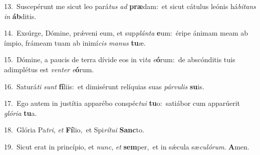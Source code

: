 {\numbfont\textcolor{\numbcolor}{13.}}~Suscepérunt me sicut leo pará\textit{tus} \textit{ad} \textbf{præ}\-dam:~\star et sicut cátulus leónis há\-\textit{bi}\-\textit{tans} \textit{in} \textbf{áb}\-ditis.\par
{\numbfont\textcolor{\numbcolor}{14.}}~Exsúrge, Dómine, prǽveni eum, et sup\-\textit{plán}\-\textit{ta} \textbf{e}\-um:~\star éripe ánimam meam ab ímpio, frámeam tuam ab inimí\textit{cis} \textit{ma}\-\textit{nus} \textbf{tu}\-æ.\par
{\numbfont\textcolor{\numbcolor}{15.}}~Dómine, a paucis de terra dívide eos in vi\textit{ta} \textit{e}\-\textbf{ó}rum:~\star de abscónditis tuis adimplétus est \textit{ven}\-\textit{ter} \textit{e}\-\textbf{ó}rum.\par
{\numbfont\textcolor{\numbcolor}{16.}}~Saturá\textit{ti} \textit{sunt} \textbf{fí}\-liis:~\star et dimisérunt relíquias suas \textit{pár}\-\textit{vu}\textit{lis} \textbf{su}\-is.\par
{\numbfont\textcolor{\numbcolor}{17.}}~Ego autem in justítia apparébo conspéc\-\textit{tu}\-\textit{i} \textbf{tu}\-o:~\star satiábor cum apparúerit \textit{gló}\-\textit{ri}\textit{a} \textbf{tu}\-a.\par
{\numbfont\textcolor{\numbcolor}{18.}}~Glória Pa\-\textit{tri}\-, \textit{et} \textbf{Fí}\-lio,~\star et Spi\-\textit{rí}\-\textit{tu}\textit{i} \textbf{Sanc}\-to.\par
{\numbfont\textcolor{\numbcolor}{19.}}~Sicut erat in princípio, et \textit{nunc}\-, \textit{et} \textbf{sem}\-per,~\star et in sǽcula sæ\-\textit{cu}\-\textit{ló}\textit{rum}. \textbf{A}\-men.\par
